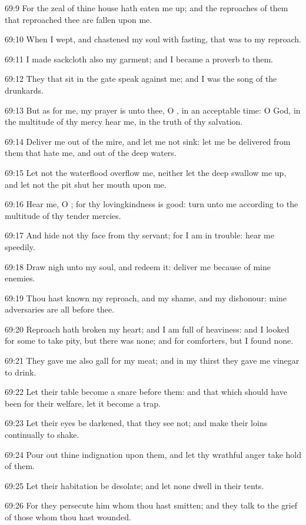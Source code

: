 69:9 For the zeal of thine house hath eaten me up; and the reproaches
of them that reproached thee are fallen upon me.

69:10 When I wept, and chastened my soul with fasting, that was to my
reproach.

69:11 I made sackcloth also my garment; and I became a proverb to
them.

69:12 They that sit in the gate speak against me; and I was the song
of the drunkards.

69:13 But as for me, my prayer is unto thee, O \LORD, in an acceptable
time: O God, in the multitude of thy mercy hear me, in the truth of
thy salvation.

69:14 Deliver me out of the mire, and let me not sink: let me be
delivered from them that hate me, and out of the deep waters.

69:15 Let not the waterflood overflow me, neither let the deep swallow
me up, and let not the pit shut her mouth upon me.

69:16 Hear me, O \LORD; for thy lovingkindness is good: turn unto me
according to the multitude of thy tender mercies.

69:17 And hide not thy face from thy servant; for I am in trouble:
hear me speedily.

69:18 Draw nigh unto my soul, and redeem it: deliver me because of
mine enemies.

69:19 Thou hast known my reproach, and my shame, and my dishonour:
mine adversaries are all before thee.

69:20 Reproach hath broken my heart; and I am full of heaviness: and I
looked for some to take pity, but there was none; and for comforters,
but I found none.

69:21 They gave me also gall for my meat; and in my thirst they gave
me vinegar to drink.

69:22 Let their table become a snare before them: and that which
should have been for their welfare, let it become a trap.

69:23 Let their eyes be darkened, that they see not; and make their
loins continually to shake.

69:24 Pour out thine indignation upon them, and let thy wrathful anger
take hold of them.

69:25 Let their habitation be desolate; and let none dwell in their
tents.

69:26 For they persecute him whom thou hast smitten; and they talk to
the grief of those whom thou hast wounded.

